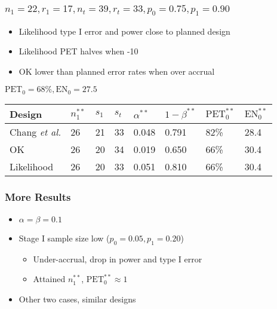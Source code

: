 \documentclass{beamer}\usepackage[]{graphicx}\usepackage[]{color}
\begin{document}
\begin{frame}
\frametitle{$n_1=22, r_1=17, n_t=39, r_t=33, p_0 = 0.75, p_1 = 0.90$}
    \begin{itemize}
        \item Likelihood type I error and power close to planned design
        \item Likelihood PET halves when -10
        \item OK lower than planned error rates when over accrual %
    \end{itemize}
$\mbox{PET}_0 = 68\%, \mbox{EN}_0 = 27.5$
\begin{table}[]
\begin{tabular}{llllllll}
Design                  & $n_1^{\ast\ast}$ & $s_1$ & $s_t$ & $\alpha^{\ast\ast}$ & $1-\beta^{\ast\ast}$ & $\mbox{PET}^{\ast\ast}_0$ & $\mbox{EN}^{\ast\ast}_0$ \\ \hline
Chang \textit{et al.}   & 26               & 21     & 33     & 0.048                                 & 0.791                & 82\%                      & 28.4                     \\
OK                      & 26               & 20     & 34     & 0.019                                 & 0.650                & 66\%                      & 30.4                     \\
Likelihood              & 26               & 20     & 33     & 0.051                                 & 0.810                & 66\%                      & 30.4                    
\end{tabular}
\end{table}
\end{frame}

\begin{frame}
\frametitle{More Results}
    \begin{itemize}
        \item $\alpha = \beta = 0.1$
        \item Stage I sample size low ($p_0 = 0.05, p_1 = 0.20$)
          \begin{itemize}
            \item Under-accrual, drop in power and type I error
            \item Attained $n_1^{\ast\ast}$, $\mbox{PET}_0^{\ast\ast} \approx 1$ %
          \end{itemize}
        \item Other two cases, similar designs
    \end{itemize}
\end{frame}
\end{document}
